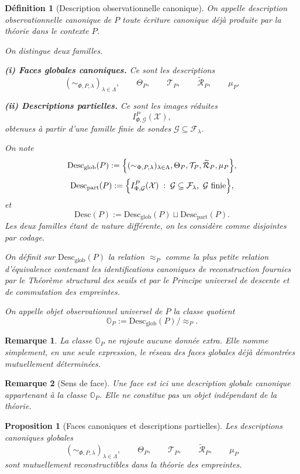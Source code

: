 \documentclass[11pt,a4paper]{article}
\newtheorem{definition}{Définition}
\newtheorem{proposition}{Proposition}
\newtheorem{remark}{Remarque}
\begin{document}
\begin{appendices}
\begin{definition}[Description observationnelle canonique]
On appelle \emph{description observationnelle canonique} de \(P\) toute écriture canonique déjà produite par la théorie dans le contexte \(P\).

On distingue deux familles.

\medskip
\noindent\textbf{(i) Faces globales canoniques.}
Ce sont les descriptions
\[
(\sim_{\Phi,P,\lambda})_{\lambda\in\Lambda},
\qquad
\Theta_P,
\qquad
\mathcal T_P,
\qquad
\widetilde{\mathcal R}_P,
\qquad
\mu_P.
\]

\medskip
\noindent\textbf{(ii) Descriptions partielles.}
Ce sont les images réduites
\[
I_{\Phi,\mathcal G}^P(\mathcal X),
\]
obtenues à partir d'une famille finie de sondes \(\mathcal G\subseteq\mathcal F_\lambda\).

On note
\[
\mathrm{Desc}_{\mathrm{glob}}(P)
:=
\Bigl\{
(\sim_{\Phi,P,\lambda})_{\lambda\in\Lambda},
\Theta_P,
\mathcal T_P,
\widetilde{\mathcal R}_P,
\mu_P
\Bigr\},
\]
\[
\mathrm{Desc}_{\mathrm{part}}(P)
:=
\Bigl\{
I_{\Phi,\mathcal G}^P(\mathcal X)\;:\;\mathcal G\subseteq\mathcal F_\lambda,\ \mathcal G \text{ finie}
\Bigr\},
\]
et
\[
\mathrm{Desc}(P):=\mathrm{Desc}_{\mathrm{glob}}(P)\sqcup \mathrm{Desc}_{\mathrm{part}}(P).
\]
Les deux familles étant de nature différente, on les considère comme disjointes par codage.

On définit sur \(\mathrm{Desc}_{\mathrm{glob}}(P)\) la relation \(\approx_P\) comme la plus petite relation d'équivalence contenant les identifications canoniques de reconstruction fournies par le \emph{Théorème structural des seuils} et par le \emph{Principe universel de descente et de commutation des empreintes}.

On appelle \emph{objet observationnel universel} de \(P\) la classe quotient
\[
\mathbb O_P := \mathrm{Desc}_{\mathrm{glob}}(P)/\!\approx_P.
\]
\end{definition}

\begin{remark}
La classe \(\mathbb O_P\) ne rajoute aucune donnée extra. Elle nomme simplement, en une seule expression, le réseau des faces globales déjà démontrées mutuellement déterminées.
\end{remark}

\begin{remark}[Sens de face]
Une face est ici une description globale canonique appartenant à la classe \(\mathbb O_P\). Elle ne constitue pas un objet indépendant de la théorie.
\end{remark}

\begin{proposition}[Faces canoniques et descriptions partielles]
Les descriptions canoniques globales
\[
(\sim_{\Phi,P,\lambda})_{\lambda\in\Lambda},
\qquad
\Theta_P,
\qquad
\mathcal T_P,
\qquad
\widetilde{\mathcal R}_P,
\qquad
\mu_P
\]
sont mutuellement reconstructibles dans la théorie des empreintes.


\end{proposition}
\end{appendices}
\end{document}
